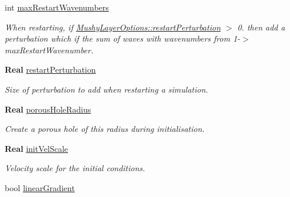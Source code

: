 \begin{DoxyCompactItemize}
\mbox{\label{struct_mushy_layer_options_a82ea1a6a37f3ae573d85e3ce18437902}} 
int \hyperlink{struct_mushy_layer_options_a82ea1a6a37f3ae573d85e3ce18437902}{max\+Restart\+Wavenumbers}
\begin{DoxyCompactList}\small\item\em When restarting, if \hyperlink{struct_mushy_layer_options_a3849ad8027ac95aacd9734627d69239d}{Mushy\+Layer\+Options\+::restart\+Perturbation} $>$ 0. then add a perturbation which if the sum of waves with wavenumbers from 1-\/$>$max\+Restart\+Wavenumber. \end{DoxyCompactList}\item 
\mbox{\label{struct_mushy_layer_options_a3849ad8027ac95aacd9734627d69239d}} 
\textbf{ Real} \hyperlink{struct_mushy_layer_options_a3849ad8027ac95aacd9734627d69239d}{restart\+Perturbation}
\begin{DoxyCompactList}\small\item\em Size of perturbation to add when restarting a simulation. \end{DoxyCompactList}\item 
\mbox{\label{struct_mushy_layer_options_a833cf824726b39193b6fe01e3fd3398c}} 
\textbf{ Real} \hyperlink{struct_mushy_layer_options_a833cf824726b39193b6fe01e3fd3398c}{porous\+Hole\+Radius}
\begin{DoxyCompactList}\small\item\em Create a porous hole of this radius during initialisation. \end{DoxyCompactList}\item 
\mbox{\label{struct_mushy_layer_options_a9d8d05ccced7f6339a0264985d8c1724}} 
\textbf{ Real} \hyperlink{struct_mushy_layer_options_a9d8d05ccced7f6339a0264985d8c1724}{init\+Vel\+Scale}
\begin{DoxyCompactList}\small\item\em Velocity scale for the initial conditions. \end{DoxyCompactList}\item 
\mbox{\label{struct_mushy_layer_options_af8bccc75a8039c786368acbf2907f9e8}} 
bool \hyperlink{struct_mushy_layer_options_af8bccc75a8039c786368acbf2907f9e8}{linear\+Gradient}

\end{DoxyCompactItemize}

